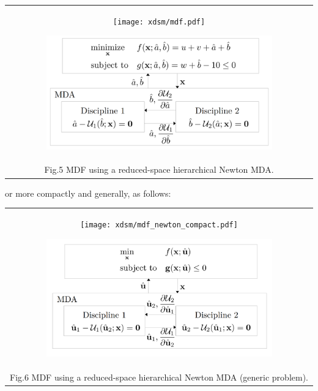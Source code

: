 \documentclass[11pt]{article}
\begin{document}
\begin{longtable}[]{@{}c@{}}
    \toprule
    \endhead
    \begin{minipage}[t]{0.97\columnwidth}\centering
        \begin{figure}
            \centering
            \texttt{[image: xdsm/mdf.pdf]}
        \end{figure}
        \begin{figure}
            \centering
            \includegraphics[width=0.9\textwidth]{images/MDF_diagram_numerical.png}
        \end{figure}
    \end{minipage}\tabularnewline
    Fig.5 MDF using a reduced-space hierarchical Newton MDA.\tabularnewline
    \bottomrule
\end{longtable}

or more compactly and generally, as follows:

\begin{longtable}[]{@{}c@{}}
    \toprule
    \endhead
    \begin{minipage}[t]{0.97\columnwidth}\centering
        \begin{figure}
            \centering
            \texttt{[image: xdsm/mdf\_newton\_compact.pdf]}
        \end{figure}
        \begin{figure}
            \centering
            \includegraphics[width=0.9\textwidth]{images/MDF_diagram_newton.png}
        \end{figure}
    \end{minipage}\tabularnewline
    Fig.6 MDF using a reduced-space hierarchical Newton MDA (generic problem).\tabularnewline
    \bottomrule
\end{longtable}
\end{document}
